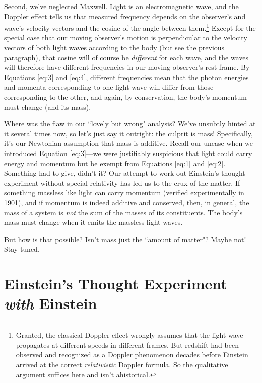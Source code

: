 \documentclass[12pt]{article}
\begin{document}
Second, we've neglected Maxwell. Light is an electromagnetic wave, and the Doppler effect tells us that measured frequency depends on the observer's and wave's velocity vectors and the cosine of the angle between them.\footnote{Granted, the classical Doppler effect wrongly assumes that the light wave propagates at different speeds in different frames. But redshift had been observed and recognized as a Doppler phenomenon decades before Einstein arrived at the correct \emph{relativistic} Doppler formula. So the qualitative argument suffices here and isn't ahistorical.} Except for the special case that our moving observer's motion is perpendicular to the velocity vectors of both light waves according to the body (but see the previous paragraph), that cosine will of course be \emph{different} for each wave, and the waves will therefore have different frequencies in our moving observer's rest frame. By Equations \ref{eq:3} and \ref{eq:4}, different frequencies mean that the photon energies and momenta corresponding to one light wave will differ from those corresponding to the other, and again, by conservation, the body's momentum must change (and its mass\textinterrobang).

Where was the flaw in our ``lovely but wrong" analysis? We've unsubtly hinted at it several times now, so let's just say it outright: the culprit is mass! Specifically, it's our Newtonian assumption that mass is additive. Recall our unease when we introduced Equation \ref{eq:3}---we were justifiably suspicious that light could carry energy and momentum but be exempt from Equations \ref{eq:1} and \ref{eq:2}. Something had to give, didn't it? Our attempt to work out Einstein's thought experiment without special relativity has led us to the crux of the matter. If something massless like light can carry momentum (verified experimentally in 1901), and if momentum is indeed additive and conserved, then, in general, the mass of a system is \emph{not} the sum of the masses of its constituents. The body's mass must change when it emits the massless light waves.

But how is that possible? Isn't mass just the ``amount of matter"? Maybe not! Stay tuned.



\section[Einstein's Thought Experiment \emph{with} Einstein]{Einstein's Thought Experiment\\ \emph{with} Einstein}
\end{document}
